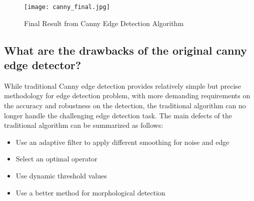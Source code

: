 \begin{figure}[!htb]
    \centering
    \texttt{[image: canny\_final.jpg]}
    \caption{Final Result from Canny Edge Detection Algorithm}
\end{figure}




\subsection{What are the drawbacks of the original canny edge detector?}
While traditional Canny edge detection provides relatively simple but precise methodology for edge detection problem, with more demanding requirements on the accuracy and robustness on the detection, the traditional algorithm can no longer handle the challenging edge detection task. The main defects of the traditional algorithm can be summarized as follows:

\begin{itemize}
    \item Use an adaptive filter to apply different smoothing for noise and edge
    \item Select an optimal operator
    \item Use dynamic threshold values
    \item Use a better method for morphological detection
\end{itemize}

